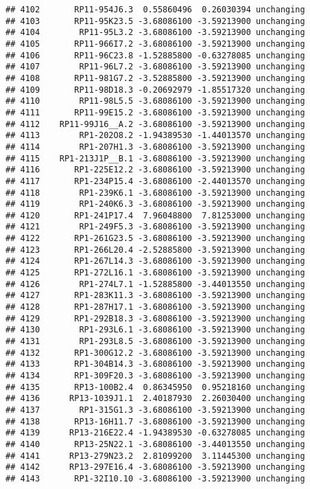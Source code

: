 \documentclass[]{article}
\begin{document}
\begin{verbatim}
## 4102       RP11-954J6.3  0.55860496  0.26030394 unchanging
## 4103       RP11-95K23.5 -3.68086100 -3.59213900 unchanging
## 4104        RP11-95L3.2 -3.68086100 -3.59213900 unchanging
## 4105       RP11-966I7.2 -3.68086100 -3.59213900 unchanging
## 4106       RP11-96C23.8 -1.52885800 -0.63278085 unchanging
## 4107        RP11-96L7.2 -3.68086100 -3.59213900 unchanging
## 4108       RP11-981G7.2 -3.52885800 -3.59213900 unchanging
## 4109       RP11-98D18.3 -0.20692979 -1.85517320 unchanging
## 4110        RP11-98L5.5 -3.68086100 -3.59213900 unchanging
## 4111       RP11-99E15.2 -3.68086100 -3.59213900 unchanging
## 4112    RP11-99J16__A.2 -3.68086100 -3.59213900 unchanging
## 4113        RP1-202O8.2 -1.94389530 -1.44013570 unchanging
## 4114        RP1-207H1.3 -3.68086100 -3.59213900 unchanging
## 4115    RP1-213J1P__B.1 -3.68086100 -3.59213900 unchanging
## 4116       RP1-225E12.2 -3.68086100 -3.59213900 unchanging
## 4117       RP1-234P15.4 -3.68086100 -2.44013570 unchanging
## 4118        RP1-239K6.1 -3.68086100 -3.59213900 unchanging
## 4119        RP1-240K6.3 -3.68086100 -3.59213900 unchanging
## 4120       RP1-241P17.4  7.96048800  7.81253000 unchanging
## 4121        RP1-249F5.3 -3.68086100 -3.59213900 unchanging
## 4122       RP1-261G23.5 -3.68086100 -3.59213900 unchanging
## 4123       RP1-266L20.4 -2.52885800 -3.59213900 unchanging
## 4124       RP1-267L14.3 -3.68086100 -3.59213900 unchanging
## 4125       RP1-272L16.1 -3.68086100 -3.59213900 unchanging
## 4126        RP1-274L7.1 -1.52885800 -3.44013550 unchanging
## 4127       RP1-283K11.3 -3.68086100 -3.59213900 unchanging
## 4128       RP1-287H17.1 -3.68086100 -3.59213900 unchanging
## 4129       RP1-292B18.3 -3.68086100 -3.59213900 unchanging
## 4130        RP1-293L6.1 -3.68086100 -3.59213900 unchanging
## 4131        RP1-293L8.5 -3.68086100 -3.59213900 unchanging
## 4132       RP1-300G12.2 -3.68086100 -3.59213900 unchanging
## 4133       RP1-304B14.3 -3.68086100 -3.59213900 unchanging
## 4134       RP1-309F20.3 -3.68086100 -3.59213900 unchanging
## 4135       RP13-100B2.4  0.86345950  0.95218160 unchanging
## 4136      RP13-1039J1.1  2.40187930  2.26030400 unchanging
## 4137        RP1-315G1.3 -3.68086100 -3.59213900 unchanging
## 4138       RP13-16H11.7 -3.68086100 -3.59213900 unchanging
## 4139      RP13-216E22.4 -1.94389530 -0.63278085 unchanging
## 4140       RP13-25N22.1 -3.68086100 -3.44013550 unchanging
## 4141      RP13-279N23.2  2.81099200  3.11445300 unchanging
## 4142      RP13-297E16.4 -3.68086100 -3.59213900 unchanging
## 4143       RP1-32I10.10 -3.68086100 -3.59213900 unchanging

\end{verbatim}
\end{document}
